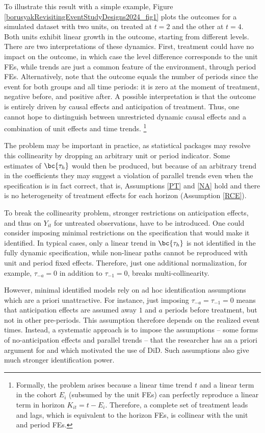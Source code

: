 \documentclass[12pt]{article}
\theoremstyle{definition}
\begin{document}
To illustrate this result with a simple example, Figure \ref{borusyakRevisitingEventStudyDesigns2024_fig1} plots the outcomes for a simulated dataset with two units, on treated at $t=2$ and the other at $t=4$. Both units exhibit linear growth in the outcome, starting from different levels. There are two interpretations of these dynamics. First, treatment could have no impact on the outcome, in which case the level difference corresponds to the unit FEs, while trends are just a common feature of the environment, through period FEs. Alternatively, note that the outcome equals the number of periods since the event for both groups and all time periods: it is zero at the moment of treatment, negative before, and positive after. A possible interpretation is that the outcome is entirely driven by causal effects and anticipation of treatment. Thus, one cannot hope to distinguish between unrestricted dynamic causal effects and a combination of unit effects and time trends. \footnote{Formally, the problem arises because a linear time trend $t$ and a linear term in the cohort $E_i$ (subsumed by the unit FEs) can perfectly reproduce a linear term in horizon $K_{it} = t - E_i$. Therefore, a complete set of treatment leads and lags, which is equivalent to the horizon FEs, is collinear with the unit and period FEs.}

The problem may be important in practice, as statistical packages may resolve this collinearity by dropping an arbitrary unit or period indicator. Some estimates of $\bc{\tau_h}$ would then be produced, but because of an arbitrary trend in the coefficients they may suggest a violation of parallel trends even when the specification is in fact correct, that is, Assumptions \ref{PT} and \ref{NA} hold and there is no heterogeneity of treatment effects for each horizon (Assumption \ref{RCE}).    

To break the collinearity problem, stronger restrictions on anticipation effects, and thus on $Y_{it}$ for untreated observations, have to be introduced. One could consider imposing minimal restrictions on the specification that would make it identified. In typical cases, only a linear trend in $\bc{\tau_h}$ is not identified in the fully dynamic specification, while non-linear paths cannot be reproduced with unit and period fixed effects. Therefore, just one additional normalization, for example, $\tau_{-a}=0$ in addition to $\tau_{-1}=0$, breaks multi-collinearity.

However, minimal identified models rely on ad hoc identification assumptions which are a priori unattractive. For instance, just imposing $\tau_{-a} = \tau_{-1} = 0$ means that anticipation effects are assumed away $1$ and $a$ periods before treatment, but not in other pre-periods. This assumption therefore depends on the realized event times. Instead, a systematic approach is to impose the assumptions -- some forms of no-anticipation effects and parallel trends -- that the researcher has an a priori argument for and which motivated the use of DiD. Such assumptions also give much stronger identification power. 
\end{document}
